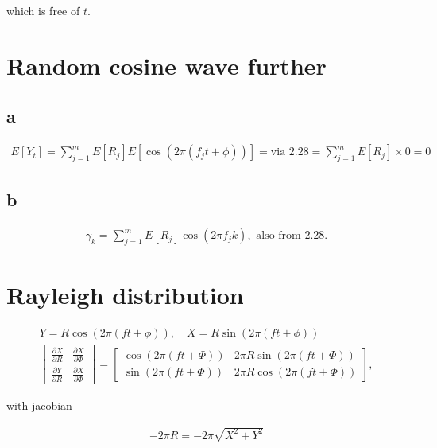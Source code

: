 \documentclass[]{book}
\theoremstyle{definition}
\theoremstyle{definition}
\theoremstyle{remark}
\begin{document}
which is free of \(t\).

\section{Random cosine wave further}\label{random-cosine-wave-further}

\subsection*{a}\label{a-20}

\begin{gather*}
  E[Y_t] = \sum_{j=1}^m E[R_j]E[\cos{(2\pi(f_j t+\phi))}] = \text{via 2.28} = \sum_{j=1}^m E[R_j] \times 0 = 0
\end{gather*}

\subsection*{b}\label{b-20}

\begin{gather*}
  \gamma_k = \sum_{j=1}^m E[R_j]\cos{(2\pi f_jk)}, \text{ also from 2.28.}
\end{gather*}

\section{Rayleigh distribution}\label{rayleigh-distribution}

\begin{gather*}
  Y = R\cos{(2\pi(ft + \phi))}, \quad X = R\sin{(2\pi(ft+\phi))}\\
  \begin{bmatrix}
    \frac{\partial X}{\partial R} & \frac{\partial X}{\partial \Phi} \\
    \frac{\partial Y}{\partial R} & \frac{\partial X}{\partial \Phi}
  \end{bmatrix} = 
  \begin{bmatrix}
    \cos{(2\pi(ft + \Phi))} & 2\pi R \sin{(2\pi(ft + \Phi))} \\
    \sin{(2\pi(ft + \Phi))} & 2\pi R \cos{(2\pi(ft + \Phi))}
  \end{bmatrix},
\end{gather*}

with jacobian

\begin{gather*}
  -2\pi R = -2\pi \sqrt{X^2 + Y^2}
\end{gather*}
\end{document}
